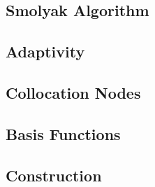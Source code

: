 \subsection{Smolyak Algorithm} 


\subsection{Adaptivity}


\subsection{Collocation Nodes}


\subsection{Basis Functions}


\subsection{Construction}

